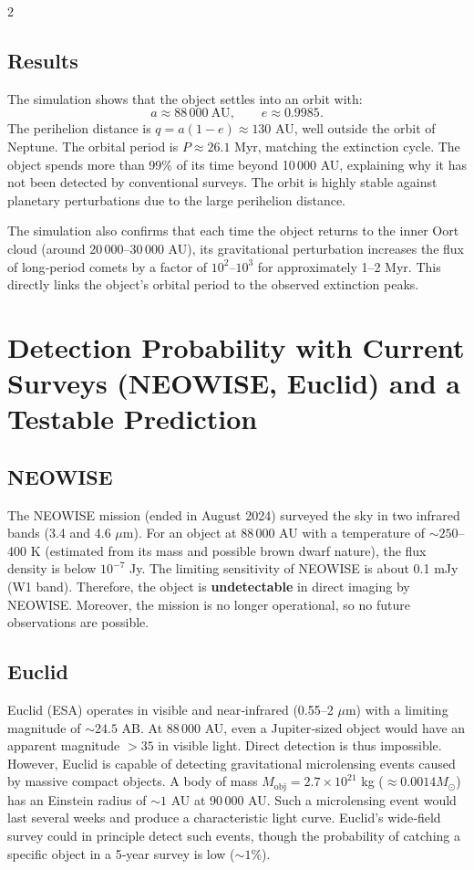 \documentclass[11pt,a4paper]{article}
\begin{document}
\begin{multicols}{2}
		\subsection{Results}
		
		The simulation shows that the object settles into an orbit with:
		\[
		a \approx 88\,000\ \text{AU},\qquad e \approx 0.9985.
		\]
		The perihelion distance is \(q = a(1-e) \approx 130\) AU, well outside the orbit of Neptune. The orbital period is \(P \approx 26.1\) Myr, matching the extinction cycle. The object spends more than 99\% of its time beyond 10\,000 AU, explaining why it has not been detected by conventional surveys. The orbit is highly stable against planetary perturbations due to the large perihelion distance.
		
		The simulation also confirms that each time the object returns to the inner Oort cloud (around 20\,000–30\,000 AU), its gravitational perturbation increases the flux of long‑period comets by a factor of \(10^2\)–\(10^3\) for approximately 1–2 Myr. This directly links the object's orbital period to the observed extinction peaks.
		
		\section{Detection Probability with Current Surveys (NEOWISE, Euclid) and a Testable Prediction}
		
		\subsection{NEOWISE}
		
		The NEOWISE mission (ended in August 2024) surveyed the sky in two infrared bands (3.4 and 4.6 \(\mu\)m). For an object at 88\,000 AU with a temperature of \(\sim 250\)–400 K (estimated from its mass and possible brown dwarf nature), the flux density is below \(10^{-7}\) Jy. The limiting sensitivity of NEOWISE is about 0.1 mJy (W1 band). Therefore, the object is \textbf{undetectable} in direct imaging by NEOWISE. Moreover, the mission is no longer operational, so no future observations are possible.
		
		\subsection{Euclid}
		
		Euclid (ESA) operates in visible and near‑infrared (0.55–2 \(\mu\)m) with a limiting magnitude of \(\sim 24.5\) AB. At 88\,000 AU, even a Jupiter‑sized object would have an apparent magnitude \(>35\) in visible light. Direct detection is thus impossible. However, Euclid is capable of detecting gravitational microlensing events caused by massive compact objects. A body of mass \(M_{\text{obj}} = 2.7\times10^{21}\) kg (\(\approx 0.0014 M_{\odot}\)) has an Einstein radius of \(\sim 1\) AU at 90\,000 AU. Such a microlensing event would last several weeks and produce a characteristic light curve. Euclid's wide‑field survey could in principle detect such events, though the probability of catching a specific object in a 5‑year survey is low (\(\sim 1\%\)).
		

\end{multicols}
\end{document}
